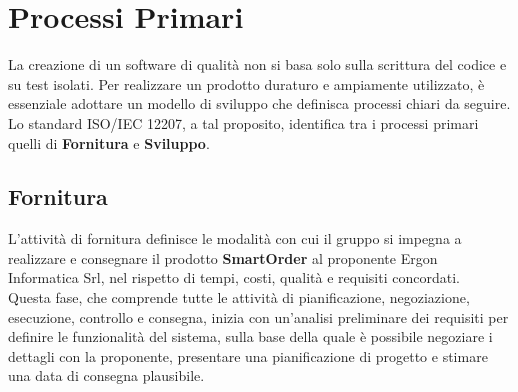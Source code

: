 \section{Processi Primari}

    La creazione di un software di qualità non si basa solo sulla scrittura del codice e su test isolati. Per realizzare un prodotto duraturo e ampiamente utilizzato, è essenziale adottare un modello di sviluppo che definisca processi chiari da seguire. Lo standard ISO/IEC 12207, a tal proposito, identifica tra i processi primari quelli di \textbf{Fornitura} e \textbf{Sviluppo}.

	\subsection{Fornitura}
	L'attività di fornitura definisce le modalità con cui il gruppo si impegna a realizzare e consegnare il prodotto \textbf{SmartOrder} al proponente Ergon Informatica Srl, nel rispetto di tempi, costi, qualità e requisiti concordati. \\
	Questa fase, che comprende tutte le attività di pianificazione, negoziazione, esecuzione, controllo e consegna, inizia con un'analisi preliminare dei requisiti per definire le funzionalità del sistema, sulla base della quale è possibile negoziare i dettagli con la proponente, presentare una pianificazione di progetto e stimare una data di consegna plausibile.
	
